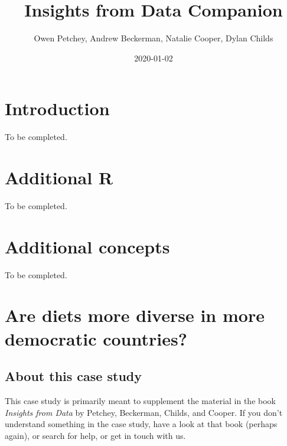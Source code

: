 \documentclass[]{book}
\title{Insights from Data Companion}
\author{Owen Petchey, Andrew Beckerman, Natalie Cooper, Dylan Childs}
\date{2020-01-02}
\newenvironment{Shaded}{\begin{snugshade}}{\end{snugshade}}
\newcommand{\DataTypeTok}[1]{\textcolor[rgb]{0.13,0.29,0.53}{#1}}
\newcommand{\KeywordTok}[1]{\textcolor[rgb]{0.13,0.29,0.53}{\textbf{#1}}}
\newcommand{\NormalTok}[1]{#1}
\newcommand{\OperatorTok}[1]{\textcolor[rgb]{0.81,0.36,0.00}{\textbf{#1}}}
\newcommand{\OtherTok}[1]{\textcolor[rgb]{0.56,0.35,0.01}{#1}}
\begin{document}
\maketitle

{
\setcounter{tocdepth}{1}
\tableofcontents
}
\hypertarget{introduction}{%
\chapter{Introduction}\label{introduction}}

To be completed.

\begin{Shaded}
\end{Shaded}

\hypertarget{additional-r}{%
\chapter{Additional R}\label{additional-r}}

To be completed.

\hypertarget{additional-concepts}{%
\chapter{Additional concepts}\label{additional-concepts}}

To be completed.

\hypertarget{WFD-2}{%
\chapter{Are diets more diverse in more democratic countries?}\label{WFD-2}}

\hypertarget{about-this-case-study}{%
\section{About this case study}\label{about-this-case-study}}

This case study is primarily meant to supplement the material in the book \emph{Insights from Data} by Petchey, Beckerman, Childs, and Cooper. If you don't understand something in the case study, have a look at that book (perhaps again), or search for help, or get in touch with us.
\end{document}
